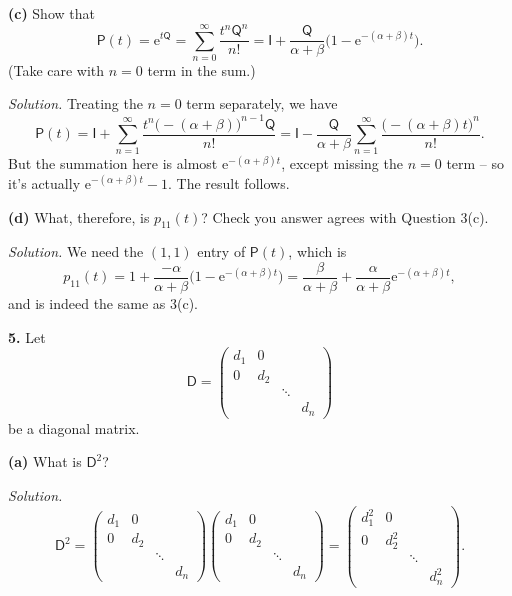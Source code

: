 \documentclass[
  a4paper,
]{article}
\theoremstyle{definition}
\theoremstyle{definition}
\theoremstyle{definition}
\theoremstyle{remark}
\begin{document}
\textbf{(c)} Show that
\[ \mathsf P(t) = \mathrm{e}^{t\mathsf Q} = \sum_{n=0}^\infty \frac{t^n \mathsf Q^n}{n!} = \mathsf I + \frac{\mathsf{Q}}{\alpha + \beta} \big(1 - \mathrm{e}^{-(\alpha+\beta)t} \big) . \]
(Take care with \(n = 0\) term in the sum.)

\begin{myanswers}
\emph{Solution.}
Treating the \(n = 0\) term separately, we have
\[ \mathsf P(t) = \mathsf I + \sum_{n=1}^\infty \frac{t^n\big(-(\alpha+\beta)\big)^{n-1}\mathsf Q}{n!} = \mathsf I - \frac{\mathsf Q }{\alpha+\beta} \sum_{n=1}^\infty \frac{\big(-(\alpha+\beta)t\big)^{n}}{n!} .     \]
But the summation here is almost \(\mathrm{e}^{-(\alpha + \beta)t}\), except missing the \(n=0\) term -- so it's actually \(\mathrm{e}^{-(\alpha + \beta)t} - 1\). The result follows.

\end{myanswers}

\textbf{(d)} What, therefore, is \(p_{11}(t)\)? Check you answer agrees with Question 3(c).

\begin{myanswers}
\emph{Solution.}
We need the \((1,1)\) entry of \(\mathsf P(t)\), which is
\[ p_{11}(t) = 1 + \frac{-\alpha}{\alpha + \beta} \big(1 - \mathrm{e}^{-(\alpha+\beta)t} \big) = \frac{\beta}{\alpha+\beta} + \frac{\alpha}{\alpha+\beta} \mathrm{e}^{-(\alpha+\beta)t} , \]
and is indeed the same as 3(c).

\end{myanswers}

\textbf{5.} Let
\[ \mathsf D = \begin{pmatrix} d_1 & 0 & &  \\
                               0 & d_2 & &  \\
                                 &  & \ddots & \\
                                &  & & d_n \end{pmatrix}  \]
be a diagonal matrix.

\textbf{(a)} What is \(\mathsf D^2\)?

\begin{myanswers}
\emph{Solution.}
\[ \mathsf D^2 = \begin{pmatrix} d_1 & 0 & &  \\
0 & d_2 & &  \\
&  & \ddots & \\
&  & & d_n \end{pmatrix}\begin{pmatrix} d_1 & 0 & &  \\
0 & d_2 & &  \\
&  & \ddots & \\
&  & & d_n \end{pmatrix} = \begin{pmatrix} d_1^2 & 0 & &  \\
0 & d_2^2 & &  \\
&  & \ddots & \\
&  & & d_n^2 \end{pmatrix} .         \]

\end{myanswers}
\end{document}
